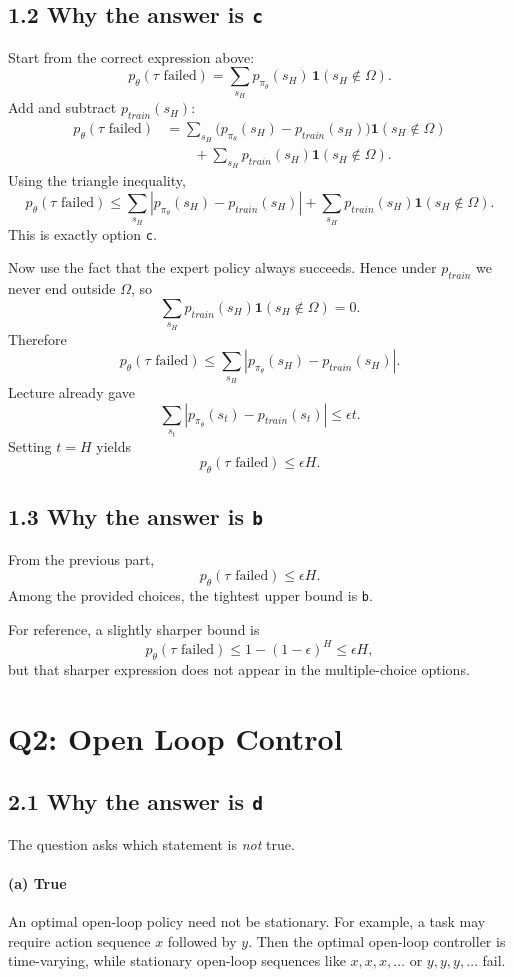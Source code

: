 \documentclass[11pt]{article}
\newcommand{\1}{\mathbf{1}}
\newcommand{\eps}{\epsilon}
\begin{document}
\subsection*{1.2 Why the answer is \texttt{c}}
Start from the correct expression above:
\[
p_\theta(\tau \text{ failed})
= \sum_{s_H} p_{\pi_\theta}(s_H)\,\1(s_H\notin \Omega).
\]
Add and subtract $p_{train}(s_H)$:
\[
\begin{aligned}
p_\theta(\tau \text{ failed})
&=
\sum_{s_H}
\bigl(p_{\pi_\theta}(s_H)-p_{train}(s_H)\bigr)\1(s_H\notin \Omega) \\
&\qquad +
\sum_{s_H} p_{train}(s_H)\1(s_H\notin \Omega).
\end{aligned}
\]
Using the triangle inequality,
\[
p_\theta(\tau \text{ failed})
\le
\sum_{s_H}\left|p_{\pi_\theta}(s_H)-p_{train}(s_H)\right|
+ \sum_{s_H} p_{train}(s_H)\1(s_H\notin \Omega).
\]
This is exactly option \texttt{c}.

Now use the fact that the expert policy always succeeds. Hence under $p_{train}$ we never end outside $\Omega$, so
\[
\sum_{s_H} p_{train}(s_H)\1(s_H\notin \Omega)=0.
\]
Therefore
\[
p_\theta(\tau \text{ failed})
\le
\sum_{s_H}\left|p_{\pi_\theta}(s_H)-p_{train}(s_H)\right|.
\]
Lecture already gave
\[
\sum_{s_t}\left|p_{\pi_\theta}(s_t)-p_{train}(s_t)\right|\le \eps t.
\]
Setting $t=H$ yields
\[
p_\theta(\tau \text{ failed})\le \eps H.
\]

\subsection*{1.3 Why the answer is \texttt{b}}
From the previous part,
\[
p_\theta(\tau \text{ failed})\le \eps H.
\]
Among the provided choices, the tightest upper bound is \texttt{b}.

For reference, a slightly sharper bound is
\[
p_\theta(\tau \text{ failed})
\le 1-(1-\eps)^H
\le \eps H,
\]
but that sharper expression does not appear in the multiple-choice options.

\section{Q2: Open Loop Control}

\subsection*{2.1 Why the answer is \texttt{d}}
The question asks which statement is \emph{not} true.

\paragraph{(a) True}
An optimal open-loop policy need not be stationary. For example, a task may require action sequence $x$ followed by $y$. Then the optimal open-loop controller is time-varying, while stationary open-loop sequences like $x,x,x,\dots$ or $y,y,y,\dots$ fail.
\end{document}
